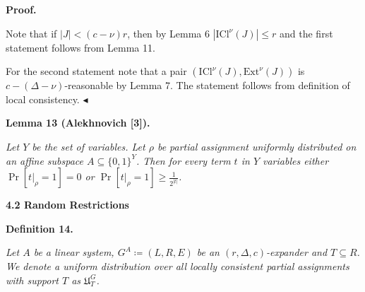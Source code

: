 \documentclass[10pt,a4paper]{article}
\begin{document}



\par\medskip\noindent\textbf{Proof.}\par




Note that if $|J|<(c-\nu)r$, then by Lemma 6 $|\mathrm{ICl}^{\nu}\left(J\right)|\leq r$ and
the first statement follows from Lemma 11.\par




For the second statement note that a pair $(\mathrm{ICl}^{\nu}\left(J\right),\mathrm{Ext}^{\nu}\left(J\right))$ is $c-(\Delta-\nu)$-reasonable by Lemma 7. The statement follows from definition of
local consistency.
$\blacktriangleleft$\par





\par\medskip\noindent\textbf{
\textbf{Lemma 13}\textbf{ }(Alekhnovich [3])\textbf{.}
}\par



\emph{Let $Y$ be the set of variables. Let $\rho$ be partial assignment uniformly distributed on an affine
subspace $A\subseteq\{0,1\}^{Y}$. Then for every term $t$ in $Y$ variables either $\Pr[t|_{\rho}=1]=0$ or $\Pr[t|_{\rho}=1]\geq\frac{1}{2^{|t|}}$.}\par








\par\medskip\noindent\textbf{
4.2 Random Restrictions}\par





\par\medskip\noindent\textbf{
\textbf{Definition 14}\textbf{.}
}\par



\emph{Let $A$ be a linear system, $G^{A}\coloneqq(L,R,E)$ be an $(r,\Delta,c)$-expander and $T\subseteq R$. We denote a uniform distribution over all locally consistent partial assignments with
support $T$ as $\mathfrak{U}^{G}_{T}$.}\par
\end{document}
